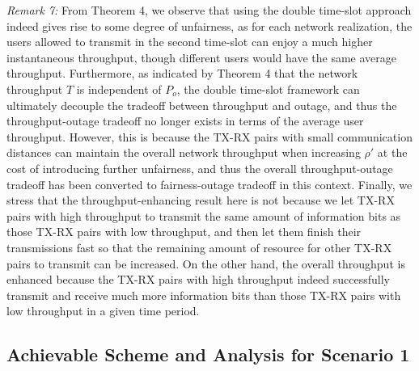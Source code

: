 \documentclass[journal,draftclsnofoot,onecolumn,12pt,twoside]{IEEEtran}
\begin{document}
{\em Remark 7:} From Theorem 4, we observe that using the double time-slot approach indeed gives rise to some degree of unfairness, as for each network realization, the users allowed to transmit in the second time-slot can enjoy a much higher instantaneous throughput, though different users would have the same average throughput. Furthermore, as indicated by Theorem 4 that the network throughput $T$ is independent of $P_o$, the double time-slot framework can ultimately decouple the tradeoff between throughput and outage, and thus the throughput-outage tradeoff no longer exists in terms of the average user throughput. However, this is because the TX-RX pairs with small communication distances can maintain the overall network throughput when increasing $\rho'$ at the cost of introducing further unfairness, and thus the overall throughput-outage tradeoff has been converted to fairness-outage tradeoff in this context. Finally, we stress that the throughput-enhancing result here is not because we let TX-RX pairs with high throughput to transmit the same amount of information bits as those TX-RX pairs with low throughput, and then let them finish their transmissions fast so that the remaining amount of resource for other TX-RX pairs to transmit can be increased. On the other hand, the overall throughput is enhanced because the TX-RX pairs with high throughput indeed successfully transmit and receive much more information bits than those TX-RX pairs with low throughput in a given time period.

\subsection{Achievable Scheme and Analysis for Scenario 1}

\label{Sec:Ach_gl1_C1}
\end{document}
